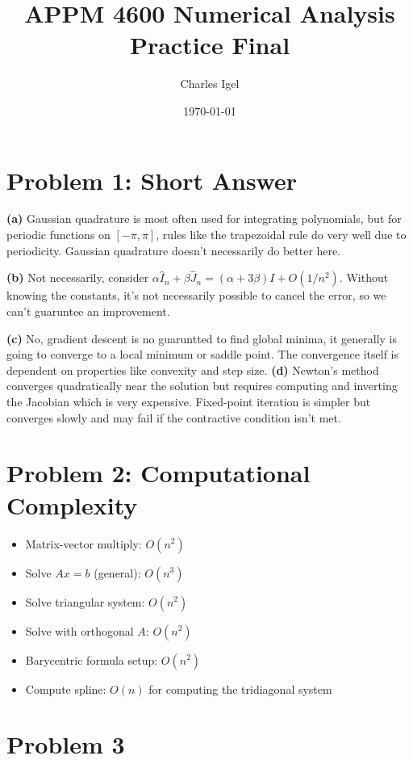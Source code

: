 \documentclass[11pt]{article}
\title{APPM 4600 Numerical Analysis \\ Practice Final }
\date{\today}
\author{Charles Igel}
\begin{document}
\maketitle

\section*{Problem 1: Short Answer}

\textbf{(a)} 
Gaussian quadrature is most often used for integrating polynomials, but for periodic functions on $[-\pi, \pi]$, rules like the trapezoidal rule do very well due to periodicity. Gaussian quadrature doesn't necessarily do better here.

\textbf{(b)} 
Not necessarily, consider $\alpha \hat{I}_n + \beta \hat{J}_n = (\alpha + 3\beta) I + O(1/n^2)$. Without knowing the constants, it's not necessarily possible to cancel the error, so we can't guaruntee an improvement.

\textbf{(c)} 
No, gradient descent is no guaruntted to find global minima, it generally is going to converge to a local minimum or saddle point. The convergence itself is dependent on properties like convexity and step size.
\textbf{(d)} 
Newton's method converges quadratically near the solution but requires computing and inverting the Jacobian which is very expensive. Fixed-point iteration is simpler but converges slowly and may fail if the contractive condition isn't met. 

\section*{Problem 2: Computational Complexity}

\begin{itemize}
\item Matrix-vector multiply: $O(n^2)$
\item Solve $Ax=b$ (general): $O(n^3)$
\item Solve triangular system: $O(n^2)$
\item Solve with orthogonal $A$: $O(n^2)$
\item Barycentric formula setup: $O(n^2)$
\item Compute spline: $O(n)$ for computing the tridiagonal system
\end{itemize}

\section*{Problem 3}
\end{document}
